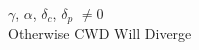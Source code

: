\documentclass[preview]{standalone}
\begin{document}
\begin{center}
$\gamma$, $\alpha$, $\delta_c$, $\delta_p$ $\not= 0$\\Otherwise CWD Will Diverge
\end{center}
\end{document}
